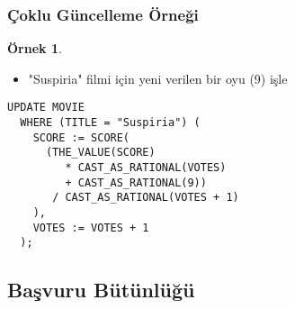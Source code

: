 \documentclass[dvipsnames]{beamer}
\theoremstyle{definition}
\theoremstyle{example}
\newtheorem{ornek}[theorem]{Örnek}
\theoremstyle{plain}
\begin{document}
\begin{frame}[fragile]
  \frametitle{Çoklu Güncelleme Örneği}

  \begin{ornek}
    \begin{itemize}
      \item "Suspiria" filmi için yeni verilen bir oyu (9) işle
    \end{itemize}

    \begin{lstlisting}
UPDATE MOVIE
  WHERE (TITLE = "Suspiria") (
    SCORE := SCORE(
      (THE_VALUE(SCORE)
         * CAST_AS_RATIONAL(VOTES)
         + CAST_AS_RATIONAL(9))
       / CAST_AS_RATIONAL(VOTES + 1)
    ),
    VOTES := VOTES + 1
  );
    \end{lstlisting}
  \end{ornek}
\end{frame}

\subsection{Başvuru Bütünlüğü}
\end{document}
